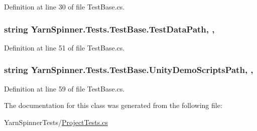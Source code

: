 Definition at line 30 of file Test\-Base.\-cs.

\hypertarget{a00170_aa9b4d902d61adad7165154a265f69aa4}{
\subsubsection[{Test\-Data\-Path}]{\setlength{\rightskip}{0pt plus 5cm}string Yarn\-Spinner.\-Tests.\-Test\-Base.\-Test\-Data\-Path\hspace{0.3cm}{\ttfamily [static]}, {\ttfamily [get]}, {\ttfamily [inherited]}}}\label{a00170_aa9b4d902d61adad7165154a265f69aa4}


Definition at line 51 of file Test\-Base.\-cs.

\hypertarget{a00170_a39922286f6255e4fd0e433a4fc7521c4}{
\subsubsection[{Unity\-Demo\-Scripts\-Path}]{\setlength{\rightskip}{0pt plus 5cm}string Yarn\-Spinner.\-Tests.\-Test\-Base.\-Unity\-Demo\-Scripts\-Path\hspace{0.3cm}{\ttfamily [static]}, {\ttfamily [get]}, {\ttfamily [inherited]}}}\label{a00170_a39922286f6255e4fd0e433a4fc7521c4}


Definition at line 59 of file Test\-Base.\-cs.



The documentation for this class was generated from the following file\-:\begin{DoxyCompactItemize}
\item 
Yarn\-Spinner\-Tests/\hyperlink{a00330}{Project\-Tests.\-cs}\end{DoxyCompactItemize}
